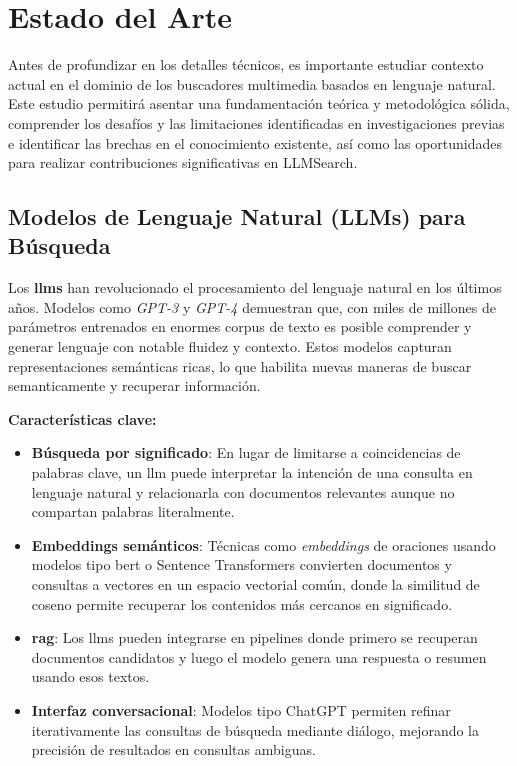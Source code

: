 
\chapter{Estado del Arte}
\label{marcoteorico}

Antes de profundizar en los detalles técnicos, es importante estudiar contexto actual en el dominio de los buscadores multimedia basados en lenguaje natural. Este estudio permitirá asentar una fundamentación teórica y metodológica sólida, comprender los desafíos y las limitaciones identificadas en investigaciones previas e identificar las brechas en el conocimiento existente, así como las oportunidades para realizar contribuciones significativas en LLMSearch.

\section{Modelos de Lenguaje Natural (LLMs) para Búsqueda}

Los \textbf{\glspl{llm}} han revolucionado el procesamiento del lenguaje natural en los últimos años. Modelos como \emph{GPT-3} y \emph{GPT-4} demuestran que, con miles de millones de parámetros entrenados en enormes corpus de texto es posible comprender y generar lenguaje con notable fluidez y contexto. Estos modelos capturan representaciones semánticas ricas, lo que habilita nuevas maneras de buscar semanticamente y recuperar información.

\textbf{Características clave:}

\begin{itemize}
  \item \textbf{Búsqueda por significado}: En lugar de limitarse a coincidencias de palabras clave, un \gls{llm} puede interpretar la intención de una consulta en lenguaje natural y relacionarla con documentos relevantes aunque no compartan palabras literalmente.
  
  \item \textbf{Embeddings semánticos}: Técnicas como \emph{embeddings} de oraciones usando modelos tipo \gls{bert} o Sentence Transformers convierten documentos y consultas a vectores en un espacio vectorial común, donde la similitud de coseno permite recuperar los contenidos más cercanos en significado.
  
  \item \textbf{\gls{rag}}: Los \glspl{llm} pueden integrarse en pipelines donde primero se recuperan documentos candidatos y luego el modelo genera una respuesta o resumen usando esos textos.
  
  \item \textbf{Interfaz conversacional}: Modelos tipo ChatGPT permiten refinar iterativamente las consultas de búsqueda mediante diálogo, mejorando la precisión de resultados en consultas ambiguas.
\end{itemize}

